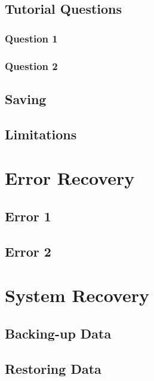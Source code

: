 \subsection{Tutorial Questions}

\subsubsection{Question 1}

\subsubsection{Question 2}

\subsection{Saving}

\subsection{Limitations}

\section{Error Recovery}

\subsection{Error 1}

\subsection{Error 2}

\section{System Recovery}

\subsection{Backing-up Data}

\subsection{Restoring Data}
